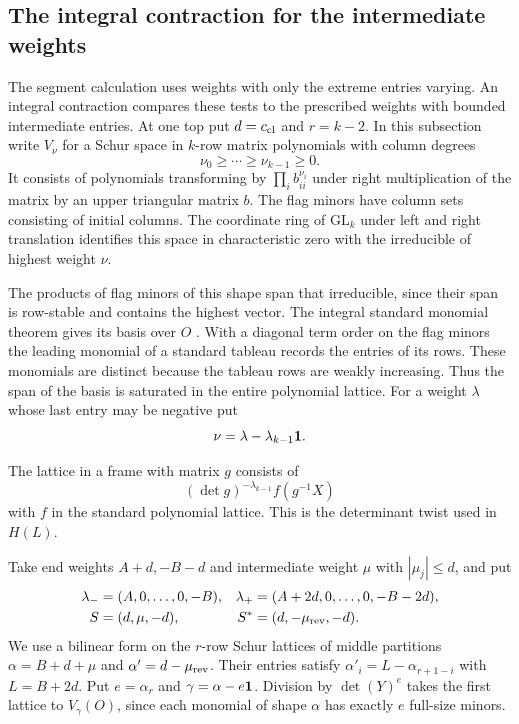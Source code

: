 \subsection{The integral contraction for the intermediate weights}
\label{sec:edge-contraction}

The segment calculation uses weights with only the extreme entries varying. An integral contraction compares these tests to the prescribed weights with bounded intermediate entries. At one top put \(d=c_{\rm cl}\)
and \(r=k-2\). In this subsection write \(V_\nu\) for a Schur
space in \(k\)-row matrix polynomials with column degrees
\[
 \nu_0\ge\cdots\ge\nu_{k-1}\ge0.
\]
It consists of polynomials
transforming by \(\prod_i b_{ii}^{\nu_i}\) under right
multiplication of the matrix by an upper triangular matrix \(b\).
The flag minors have column sets consisting of initial columns.
The coordinate ring of \(\mathrm{GL}_k\) under left and right
translation identifies this space in characteristic zero with the
irreducible of highest weight \(\nu\).

The products of flag minors
of this shape span that irreducible, since their span is
row-stable and contains the highest vector. The integral standard
monomial theorem gives its basis over \(O\)
\cite[Theorem II.2.16]{abw-schur}. With a diagonal term order
on the flag minors the leading monomial of a standard tableau
records the entries of its rows. These monomials are distinct
because the tableau rows are weakly increasing. Thus the
span of the basis is saturated in the entire polynomial lattice.
For a weight \(\lambda\) whose last entry may be negative put
\[
 \nu=\lambda-\lambda_{k-1}{\bf 1}.
\]

The lattice in a frame with matrix \(g\) consists of
\[
 (\det g)^{-\lambda_{k-1}}f(g^{-1}X)
\]
with \(f\) in the
standard polynomial lattice. This is the determinant twist
used in \(H(L)\).

Take end weights \(A+d,-B-d\) and intermediate weight \(\mu\)
with \(|\mu_j|\le d\), and put
\begin{equation}\label{eq:edge-intermediate-weights}\begin{aligned}
 \lambda_-&=(A,0,\ldots,0,-B),&
 \lambda_+&=(A+2d,0,\ldots,0,-B-2d),\\
 S&=(d,\mu,-d),&
 S^*&=(d,-\mu_{\rm rev},-d).
\end{aligned}\end{equation}
We use a bilinear form on the \(r\)-row Schur lattices of
middle partitions
\(\alpha=B+d+\mu\) and \(\alpha'=d-\mu_{\rm rev}\).
Their entries satisfy
\(\alpha'_i=L-\alpha_{r+1-i}\) with \(L=B+2d\).
Put \(e=\alpha_r\) and \(\gamma=\alpha-e{\bf1}\).
Division by \(\det(Y)^e\) takes the first lattice to
\(V_\gamma(O)\), since each monomial of shape \(\alpha\)
has exactly \(e\) full-size minors.

